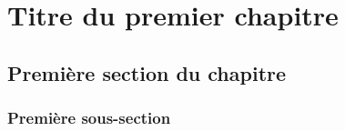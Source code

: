 
\clearemptydoublepage
\chapter{Titre du premier chapitre}


\section{Première section du chapitre}

\subsection{Première sous-section}







